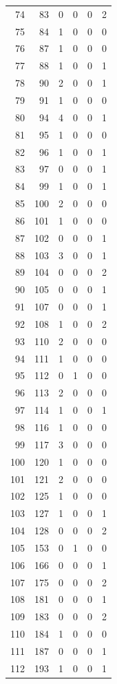\documentclass[
  letterpaper,
  DIV=11,
  numbers=noendperiod]{scrreprt}
\begin{document}
\begin{longtable}[]{@{}rrrrrr@{}}
74 & 83 & 0 & 0 & 0 & 2 \\
75 & 84 & 1 & 0 & 0 & 0 \\
76 & 87 & 1 & 0 & 0 & 0 \\
77 & 88 & 1 & 0 & 0 & 1 \\
78 & 90 & 2 & 0 & 0 & 1 \\
79 & 91 & 1 & 0 & 0 & 0 \\
80 & 94 & 4 & 0 & 0 & 1 \\
81 & 95 & 1 & 0 & 0 & 0 \\
82 & 96 & 1 & 0 & 0 & 1 \\
83 & 97 & 0 & 0 & 0 & 1 \\
84 & 99 & 1 & 0 & 0 & 1 \\
85 & 100 & 2 & 0 & 0 & 0 \\
86 & 101 & 1 & 0 & 0 & 0 \\
87 & 102 & 0 & 0 & 0 & 1 \\
88 & 103 & 3 & 0 & 0 & 1 \\
89 & 104 & 0 & 0 & 0 & 2 \\
90 & 105 & 0 & 0 & 0 & 1 \\
91 & 107 & 0 & 0 & 0 & 1 \\
92 & 108 & 1 & 0 & 0 & 2 \\
93 & 110 & 2 & 0 & 0 & 0 \\
94 & 111 & 1 & 0 & 0 & 0 \\
95 & 112 & 0 & 1 & 0 & 0 \\
96 & 113 & 2 & 0 & 0 & 0 \\
97 & 114 & 1 & 0 & 0 & 1 \\
98 & 116 & 1 & 0 & 0 & 0 \\
99 & 117 & 3 & 0 & 0 & 0 \\
100 & 120 & 1 & 0 & 0 & 0 \\
101 & 121 & 2 & 0 & 0 & 0 \\
102 & 125 & 1 & 0 & 0 & 0 \\
103 & 127 & 1 & 0 & 0 & 1 \\
104 & 128 & 0 & 0 & 0 & 2 \\
105 & 153 & 0 & 1 & 0 & 0 \\
106 & 166 & 0 & 0 & 0 & 1 \\
107 & 175 & 0 & 0 & 0 & 2 \\
108 & 181 & 0 & 0 & 0 & 1 \\
109 & 183 & 0 & 0 & 0 & 2 \\
110 & 184 & 1 & 0 & 0 & 0 \\
111 & 187 & 0 & 0 & 0 & 1 \\
112 & 193 & 1 & 0 & 0 & 1 \\

\end{longtable}
\end{document}
